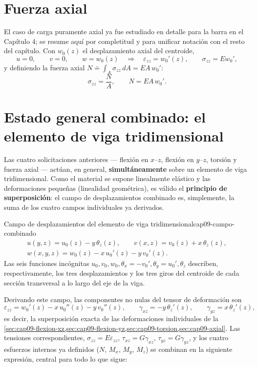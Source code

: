 \section{Fuerza axial}
\label{sec:cap09-axial}

El caso de carga puramente axial ya fue estudiado en detalle para la barra en el Capítulo 4; se resume aquí por completitud y para unificar notación con el resto del capítulo. Con $w_0(z)$ el desplazamiento axial del centroide,
\[
u=0, \qquad v=0, \qquad w=w_0(z) \quad\Longrightarrow\quad \varepsilon_{zz}=w_0'(z), \qquad \sigma_{zz}=Ew_0' ,
\]
y definiendo la fuerza axial $N\doteq\int_A\sigma_{zz}\,dA=EA\,w_0'$:
\[
\sigma_{zz} = \frac{N}{A} , \qquad N = EA\,w_0' .
\]

\section{Estado general combinado: el elemento de viga tridimensional}
\label{sec:cap09-estado-combinado}

Las cuatro solicitaciones anteriores --- flexión en $x$--$z$, flexión en $y$--$z$, torsión y fuerza axial --- actúan, en general, \textbf{simultáneamente} sobre un elemento de viga tridimensional. Como el material se supone linealmente elástico y las deformaciones pequeñas (linealidad geométrica), es válido el \textbf{principio de superposición}: el campo de desplazamientos combinado es, simplemente, la suma de los cuatro campos individuales ya derivados.

\begin{ecnimportante}{Campo de desplazamientos del elemento de viga tridimensional}{cap09-campo-combinado}
\[
\begin{gathered}
u(y,z) = u_0(z) - y\,\theta_z(z), \qquad
v(x,z) = v_0(z) + x\,\theta_z(z), \\[4pt]
w(x,y,z) = w_0(z) - x\,u_0'(z) - y\,v_0'(z) .
\end{gathered}
\]
Las seis funciones incógnitas $u_0,v_0,w_0,\theta_x=-v_0',\theta_y=u_0',\theta_z$ describen, respectivamente, los tres desplazamientos y los tres giros del centroide de cada sección transversal a lo largo del eje de la viga.
\end{ecnimportante}

Derivando este campo, las componentes no nulas del tensor de deformación son
\[
\varepsilon_{zz} = w_0'(z) - x\,u_0''(z) - y\,v_0''(z), \qquad
\gamma_{xz} = -y\,\theta_z'(z), \qquad
\gamma_{yz} = x\,\theta_z'(z) ,
\]
es decir, la superposición exacta de las deformaciones individuales de la \cref{sec:cap09-flexion-xz,sec:cap09-flexion-yz,sec:cap09-torsion,sec:cap09-axial}. Las tensiones correspondientes, $\sigma_{zz}=E\varepsilon_{zz}$, $\tau_{xz}=G\gamma_{xz}$, $\tau_{yz}=G\gamma_{yz}$, y los cuatro esfuerzos internos ya definidos ($N$, $M_x$, $M_y$, $M_z$) se combinan en la siguiente expresión, central para todo lo que sigue:

